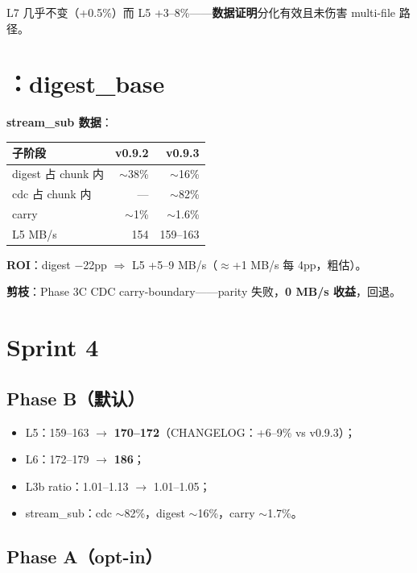 L7 几乎不变（+0.5\%）而 L5 +3--8\%——\textbf{数据证明}分化有效且未伤害 multi-file 路径。

\section{：digest\_base}

\textbf{stream\_sub 数据}：
\begin{table}[htbp]
\centering
\begin{tabular}{@{}lrr@{}}
\toprule
子阶段 & v0.9.2 & v0.9.3 \\
\midrule
digest 占 chunk 内 & $\sim$38\% & $\sim$16\% \\
cdc 占 chunk 内 & — & $\sim$82\% \\
carry & $\sim$1\% & $\sim$1.6\% \\
\midrule
L5 MB/s & 154 & 159--163 \\
\bottomrule
\end{tabular}
\end{table}

\textbf{ROI}：digest $-$22pp $\Rightarrow$ L5 +5--9 MB/s（$\approx$+1 MB/s 每 4pp，粗估）。

\textbf{剪枝}：Phase 3C CDC carry-boundary——parity 失败，\textbf{0 MB/s 收益}，回退。

\section{ Sprint 4}

\subsection{Phase B（默认）}

\begin{itemize}[nosep]
  \item L5：159--163 $\rightarrow$ \textbf{170--172}（CHANGELOG：+6--9\% vs v0.9.3）；
  \item L6：172--179 $\rightarrow$ \textbf{186}；
  \item L3b ratio：1.01--1.13 $\rightarrow$ 1.01--1.05；
  \item stream\_sub：cdc $\sim$82\%，digest $\sim$16\%，carry $\sim$1.7\%。
\end{itemize}

\subsection{Phase A（opt-in）}

